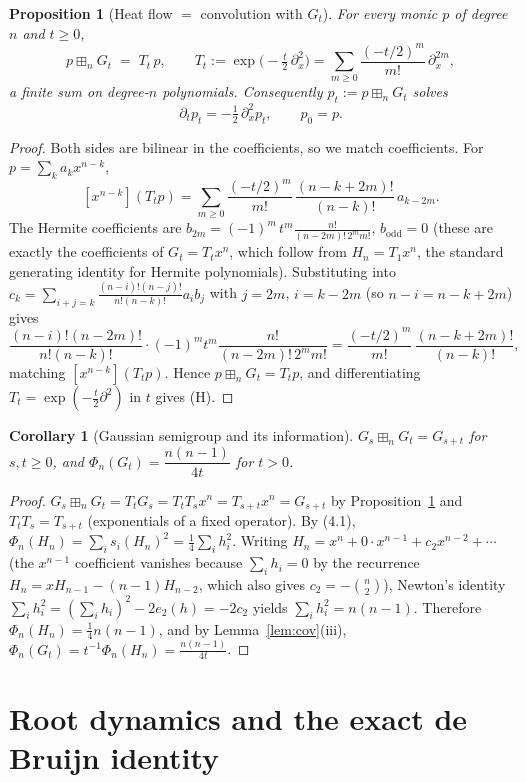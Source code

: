 \documentclass[12pt]{article}
\newtheorem{proposition}{Proposition}
\newtheorem{corollary}{Corollary}
\theoremstyle{remark}
\newcommand{\boxp}{\boxplus_n}
\begin{document}
\begin{proposition}[Heat flow $=$ convolution with $G_t$]\label{prop:heatconv}
For every monic $p$ of degree $n$ and $t\ge0$,
\[
p\boxp G_t \;=\; T_t\,p,\qquad T_t:=\exp\!\big(-\tfrac t2\,\partial_x^2\big)
=\sum_{m\ge0}\frac{(-t/2)^m}{m!}\,\partial_x^{2m},
\]
a finite sum on degree-$n$ polynomials.  Consequently $p_t:=p\boxp G_t$ solves
\[
\partial_t p_t=-\tfrac12\,\partial_x^2 p_t,\qquad p_0=p. \tag{H}
\]
\end{proposition}

\begin{proof}
Both sides are bilinear in the coefficients, so we match coefficients.  For
$p=\sum_k a_kx^{n-k}$,
\[
[x^{n-k}](T_tp)=\sum_{m\ge0}\frac{(-t/2)^m}{m!}\,\frac{(n-k+2m)!}{(n-k)!}\,a_{k-2m}.
\]
The Hermite coefficients are $b_{2m}=(-1)^m\,t^{m}\frac{n!}{(n-2m)!\,2^mm!}$,
$b_{\text{odd}}=0$ (these are exactly the coefficients of $G_t=T_t x^n$, which
follow from $H_n=T_1x^n$, the standard generating identity for Hermite
polynomials).  Substituting into
$c_k=\sum_{i+j=k}\frac{(n-i)!(n-j)!}{n!(n-k)!}a_ib_j$ with $j=2m$, $i=k-2m$
(so $n-i=n-k+2m$) gives
\[
\frac{(n-i)!(n-2m)!}{n!(n-k)!}\cdot(-1)^m t^m\frac{n!}{(n-2m)!\,2^mm!}
=\frac{(-t/2)^m}{m!}\,\frac{(n-k+2m)!}{(n-k)!},
\]
matching $[x^{n-k}](T_tp)$.  Hence $p\boxp G_t=T_tp$, and differentiating
$T_t=\exp(-\tfrac t2\partial^2)$ in $t$ gives (H).
\end{proof}

\begin{corollary}[Gaussian semigroup and its information]\label{cor:gauss}
$G_s\boxp G_t=G_{s+t}$ for $s,t\ge0$, and
$\Phi_n(G_t)=\dfrac{n(n-1)}{4t}$ for $t>0$.
\end{corollary}

\begin{proof}
$G_s\boxp G_t=T_tG_s=T_tT_sx^n=T_{s+t}x^n=G_{s+t}$ by
Proposition~\ref{prop:heatconv} and $T_tT_s=T_{s+t}$ (exponentials of a fixed
operator).  By (4.1), $\Phi_n(H_n)=\sum_i s_i(H_n)^2=\tfrac14\sum_i h_i^2$.
Writing $H_n=x^n+0\cdot x^{n-1}+c_2x^{n-2}+\cdots$ (the
$x^{n-1}$ coefficient vanishes because $\sum_ih_i=0$ by the recurrence
$H_n=xH_{n-1}-(n-1)H_{n-2}$, which also gives $c_2=-\binom n2$), Newton's
identity $\sum_i h_i^2=(\sum_i h_i)^2-2e_2(h)=-2c_2$ yields
$\sum_i h_i^2=n(n-1)$.  Therefore $\Phi_n(H_n)=\tfrac14 n(n-1)$, and by
Lemma~\ref{lem:cov}(iii), $\Phi_n(G_t)=t^{-1}\Phi_n(H_n)=\frac{n(n-1)}{4t}$.
\end{proof}

\section{Root dynamics and the exact de Bruijn identity}\label{sec:debruijn}
\end{document}
